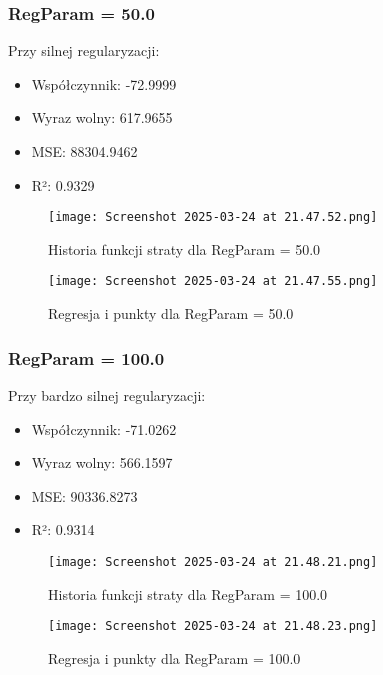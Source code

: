 \documentclass{article}
\begin{document}
\subsubsection{RegParam = 50.0}
Przy silnej regularyzacji:
\begin{itemize}
    \item Współczynnik: -72.9999
    \item Wyraz wolny: 617.9655
    \item MSE: 88304.9462
    \item R²: 0.9329
\end{itemize}

\begin{figure}[H]
    \centering
    \begin{minipage}{0.45\textwidth}
        \texttt{[image: Screenshot 2025-03-24 at 21.47.52.png]}
        \caption{Historia funkcji straty dla RegParam = 50.0}
    \end{minipage}
    \hfill
    \begin{minipage}{0.45\textwidth}
        \texttt{[image: Screenshot 2025-03-24 at 21.47.55.png]}
        \caption{Regresja i punkty dla RegParam = 50.0}
    \end{minipage}
\end{figure}

\subsubsection{RegParam = 100.0}
Przy bardzo silnej regularyzacji:
\begin{itemize}
    \item Współczynnik: -71.0262
    \item Wyraz wolny: 566.1597
    \item MSE: 90336.8273
    \item R²: 0.9314
\end{itemize}

\begin{figure}[H]
    \centering
    \begin{minipage}{0.45\textwidth}
        \texttt{[image: Screenshot 2025-03-24 at 21.48.21.png]}
        \caption{Historia funkcji straty dla RegParam = 100.0}
    \end{minipage}
    \hfill
    \begin{minipage}{0.45\textwidth}
        \texttt{[image: Screenshot 2025-03-24 at 21.48.23.png]}
        \caption{Regresja i punkty dla RegParam = 100.0}
    \end{minipage}
\end{figure}
\end{document}

